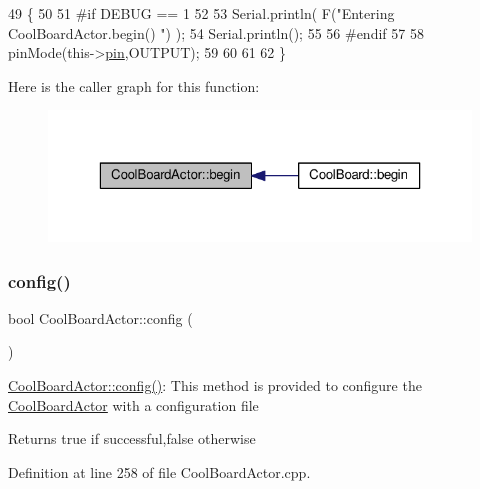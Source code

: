 \begin{DoxyCode}
49 \{
50 
51 \textcolor{preprocessor}{#if DEBUG == 1 }
52  
53     Serial.println( F(\textcolor{stringliteral}{"Entering CoolBoardActor.begin() "}) );
54     Serial.println();
55 
56 \textcolor{preprocessor}{#endif}
57 
58     pinMode(this->\hyperlink{class_cool_board_actor_a8b5c0b41fe6033b68d9e1ed00bc2e122}{pin},OUTPUT);
59     
60     
61 
62 \}
\end{DoxyCode}
Here is the caller graph for this function\+:\nopagebreak
\begin{figure}[H]
\begin{center}
\leavevmode
\includegraphics[width=323pt]{dc/d69/class_cool_board_actor_a7f4422fd85a5510bc2cdfd68e109be5e_icgraph}
\end{center}
\end{figure}
\mbox{\label{class_cool_board_actor_a5af5538fc7d169f63127e06d5219bcd4}} 
\subsubsection{\texorpdfstring{config()}{config()}}
{\footnotesize\ttfamily bool Cool\+Board\+Actor\+::config (\begin{DoxyParamCaption}{ }\end{DoxyParamCaption})}

\hyperlink{class_cool_board_actor_a5af5538fc7d169f63127e06d5219bcd4}{Cool\+Board\+Actor\+::config()}\+: This method is provided to configure the \hyperlink{class_cool_board_actor}{Cool\+Board\+Actor} with a configuration file

\begin{DoxyReturn}{Returns}
true if successful,false otherwise 
\end{DoxyReturn}


Definition at line 258 of file Cool\+Board\+Actor.\+cpp.


